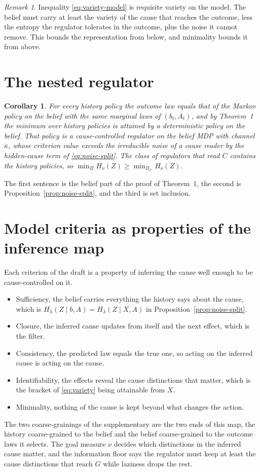 \documentclass[10pt]{article}
\theoremstyle{plain}
\newtheorem{corollary}{Corollary}
\theoremstyle{remark}
\newtheorem{remark}{Remark}
\begin{document}
\begin{remark}
Inequality \eqref{eq:variety-model} is requisite variety on the model.
The belief must carry at least the variety of the cause that reaches the outcome, less the entropy the regulator tolerates in the outcome, plus the noise it cannot remove.
This bounds the representation from below, and minimality bounds it from above.
\end{remark}

\section{The nested regulator}
\begin{corollary}
For every history policy the outcome law equals that of the Markov policy on the belief with the same marginal laws of $(b_t, A_t)$, and by Theorem~1 the minimum over history policies is attained by a deterministic policy on the belief.
That policy is a cause-controlled regulator on the belief MDP with channel $\bar\kappa$, whose criterion value exceeds the irreducible noise of a cause reader by the hidden-cause term of \eqref{eq:noise-split}.
The class of regulators that read $C$ contains the history policies, so $\min_{\Pi} H_\nu(Z) \ge \min_{\Pi_C} H_\nu(Z)$.
\end{corollary}
The first sentence is the belief part of the proof of Theorem~1, the second is Proposition~\ref{prop:noise-split}, and the third is set inclusion.

\section{Model criteria as properties of the inference map}
Each criterion of the draft is a property of inferring the cause well enough to be cause-controlled on it.
\begin{itemize}
  \item Sufficiency, the belief carries everything the history says about the cause, which is $H_\lambda(Z \mid b,A) = H_\lambda(Z \mid X,A)$ in Proposition~\ref{prop:noise-split}.
  \item Closure, the inferred cause updates from itself and the next effect, which is the filter.
  \item Consistency, the predicted law equals the true one, so acting on the inferred cause is acting on the cause.
  \item Identifiability, the effects reveal the cause distinctions that matter, which is the bracket of \eqref{eq:variety} being attainable from $X$.
  \item Minimality, nothing of the cause is kept beyond what changes the action.
\end{itemize}
The two coarse-grainings of the supplementary are the two ends of this map, the history coarse-grained to the belief and the belief coarse-grained to the outcome laws it selects.
The goal measure $\nu$ decides which distinctions in the inferred cause matter, and the information floor says the regulator must keep at least the cause distinctions that reach $G$ while laziness drops the rest.
\end{document}
